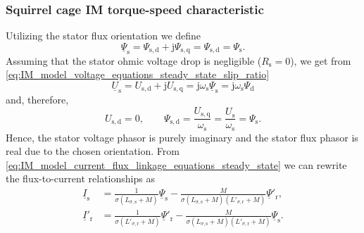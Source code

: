 \begin{frame}
	\frametitle{Squirrel cage IM torque-speed characteristic} 
    Utilizing the stator flux orientation we define
    $$ \underline{\Psi}_\mathrm{s} = \Psi_\mathrm{s,d} + \mathrm{j}\Psi_\mathrm{s,q} = \Psi_\mathrm{s,d} = \Psi_\mathrm{s}.
    $$
    \pause
    Assuming that the stator ohmic voltage drop is negligible ($R_\mathrm{s}=0$), we get from \eqref{eq:IM_model_voltage_equations_steady_state_slip_ratio} 
    \begin{equation}
        \underline{U}_\mathrm{s} = U_\mathrm{s,d} + \mathrm{j} U_\mathrm{s,q} = \mathrm{j}\omega_\mathrm{s}\underline{\Psi}_\mathrm{s} = \mathrm{j}\omega_\mathrm{s}\Psi_\mathrm{d}
    \end{equation} 
    \pause
    and, therefore,
    \begin{equation}
        U_\mathrm{s,d} = 0, \qquad \Psi_\mathrm{s,d}  = \frac{U_\mathrm{s,q}}{\omega_\mathrm{s}}= \frac{U_\mathrm{s}}{\omega_\mathrm{s}}= \Psi_\mathrm{s}.
        \label{eq:IM_model_stator_flux_orientation_steady_state}
    \end{equation}
    Hence, the stator voltage phasor is purely imaginary and the stator flux phasor is real due to the chosen orientation. \pause From \eqref{eq:IM_model_current_flux_linkage_equations_steady_state} we can rewrite the flux-to-current relationships as
    \begin{equation}
        \begin{split}
            \underline{I}_\mathrm{s} &= \frac{1}{\sigma (L_{\sigma,\mathrm{s}} +M)} \underline{\Psi}_\mathrm{s} -  \frac{M}{\sigma(L_{\sigma,\mathrm{s}} +M)(L'_{\sigma,\mathrm{r}} +M)}\underline{\Psi}'_\mathrm{r},\\
            \underline{I}'_\mathrm{r} &= \frac{1}{\sigma (L'_{\sigma,\mathrm{r}} +M)} \underline{\Psi}'_\mathrm{r} -  \frac{M}{\sigma(L_{\sigma,\mathrm{s}} +M)(L'_{\sigma,\mathrm{r}} +M)}\underline{\Psi}_\mathrm{s}.
        \end{split}
        \label{eq:IM_model_current_flux_linkage_equations_steady_state_squirrel_cage}
    \end{equation}
\end{frame}

